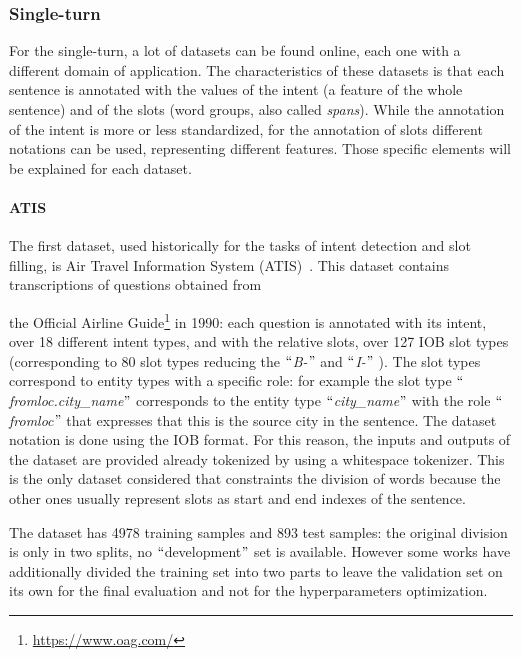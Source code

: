 \subsubsection{Single-turn}
For the single-turn, a lot of datasets can be found online, each one with a different domain of application. The characteristics of these datasets is that each sentence is annotated with the values of the intent (a feature of the whole sentence) and of the slots (word groups, also called \textit{spans}). While the annotation of the intent is more or less standardized, for the annotation of slots different notations can be used, representing different features. Those specific elements will be explained for each dataset.

\paragraph{ATIS}
The first dataset, used historically for the tasks of intent detection and slot filling, is Air Travel Information System (ATIS)~\cite{hemphill1990atis}. This dataset contains transcriptions of questions obtained from

the Official Airline Guide\footnote{\url{https://www.oag.com/}} in 1990: each question is annotated with its intent, over 18 different intent types, and with the relative slots, over 127 IOB slot types (corresponding to 80 slot types reducing the $``$\textit{B-}$"$  and $``$\textit{I-}$"$ ). The slot types correspond to entity types with a specific role: for example the slot type $``$\textit{fromloc.city\_name}$"$  corresponds to the entity type $``$\textit{city\_name}$"$  with the role $``$\textit{fromloc}$"$  that expresses that this is the source city in the sentence. The dataset notation is done using the IOB format. For this reason, the inputs and outputs of the dataset are provided already tokenized by using a whitespace tokenizer. This is the only dataset considered that constraints the division of words because the other ones usually represent slots as start and end indexes of the sentence.

The dataset has 4978 training samples and 893 test samples: the original division is only in two splits, no $``$development$"$  set is available. However some works have additionally divided the training set into two parts to leave the validation set on its own for the final evaluation and not for the hyperparameters optimization.

